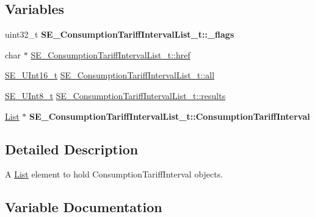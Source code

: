\subsection*{Variables}
\begin{DoxyCompactItemize}
\item 
\mbox{\label{group__ConsumptionTariffIntervalList_gaa3acaa54e750eda4cc32f1b04cf73faf}} 
uint32\+\_\+t {\bfseries S\+E\+\_\+\+Consumption\+Tariff\+Interval\+List\+\_\+t\+::\+\_\+flags}
\item 
char $\ast$ \hyperlink{group__ConsumptionTariffIntervalList_ga489e67a6df6a55b687177b242b485f48}{S\+E\+\_\+\+Consumption\+Tariff\+Interval\+List\+\_\+t\+::href}
\item 
\hyperlink{group__UInt16_gac68d541f189538bfd30cfaa712d20d29}{S\+E\+\_\+\+U\+Int16\+\_\+t} \hyperlink{group__ConsumptionTariffIntervalList_ga76cb598a0b38538fdd3a63b1a828b686}{S\+E\+\_\+\+Consumption\+Tariff\+Interval\+List\+\_\+t\+::all}
\item 
\hyperlink{group__UInt8_gaf7c365a1acfe204e3a67c16ed44572f5}{S\+E\+\_\+\+U\+Int8\+\_\+t} \hyperlink{group__ConsumptionTariffIntervalList_gad7dfbe5bbec12b1511d6f80a360f710f}{S\+E\+\_\+\+Consumption\+Tariff\+Interval\+List\+\_\+t\+::results}
\item 
\mbox{\label{group__ConsumptionTariffIntervalList_gae8e3eb5bd31d36fa84dfd0b86d749ee8}} 
\hyperlink{structList}{List} $\ast$ {\bfseries S\+E\+\_\+\+Consumption\+Tariff\+Interval\+List\+\_\+t\+::\+Consumption\+Tariff\+Interval}
\end{DoxyCompactItemize}


\subsection{Detailed Description}
A \hyperlink{structList}{List} element to hold Consumption\+Tariff\+Interval objects. 

\subsection{Variable Documentation}
\mbox{\label{group__ConsumptionTariffIntervalList_ga76cb598a0b38538fdd3a63b1a828b686}} 
